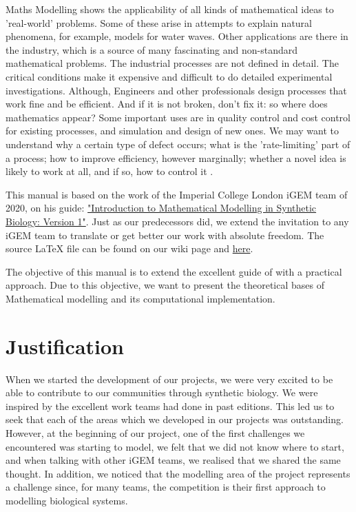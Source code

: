 \documentclass[11pt, letterpaper, english]{article}
\begin{document}
\par{Maths Modelling shows the applicability of all kinds of mathematical ideas to 'real-world' problems. Some of these arise in attempts to explain natural phenomena, for example, models for water waves. Other applications are there in the industry, which is a source of many fascinating and non-standard mathematical problems. The industrial processes are not defined in detail. The critical conditions make it expensive and difficult to do detailed experimental investigations. Although, Engineers and other professionals design processes that work fine and be efficient. And if it is not broken, don't fix it: so where does mathematics appear? Some important uses are in quality control and cost control for existing processes, and simulation and design of new ones. We may want to understand why a certain type of defect occurs; what is the 'rate-limiting' part of a process; how to improve efficiency, however marginally; whether a novel idea is likely to work at all, and if so, how to control it \cite{Howison_2008}.}

\par{This manual is based on the work of the Imperial College London iGEM team of 2020, on his guide: \href{https://static.igem.org/mediawiki/2020/9/96/T--Imperial_College--introtomodelling.pdf}{"Introduction to Mathematical Modelling in Synthetic Biology: Version 1"}. Just as our predecessors did, we extend the invitation to any iGEM team to translate or get better our work with absolute freedom. The source LaTeX file can be found on our wiki page and \href{https://github.com/Rexmali/iGEM-UAM2022}{here}.}

\par{The objective of this manual is to extend the excellent guide of \cite{igem_2020} with a practical approach. Due to this objective, we want to present the theoretical bases of Mathematical modelling and its computational implementation.}

\newpage

\section{Justification}

\par{When we started the development of our projects, we were very excited to be able to contribute to our communities through synthetic biology. We  were inspired by the excellent work teams had done in past editions. This led us to seek that each of the areas which we developed in our projects was outstanding. However, at the beginning of our project, one of the first challenges we encountered was starting to model, we felt that we did not know where to start, and when talking with other iGEM teams, we realised that we shared the same thought. In addition, we noticed that the modelling area of the project represents a challenge since, for many teams, the competition is their first approach to modelling biological systems.} 
\end{document}
